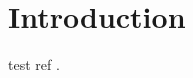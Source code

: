 \documentclass[Main]{subfiles}
\begin{document}
\chapter{Introduction}

test ref \cite{essentials}.
\end{document}
